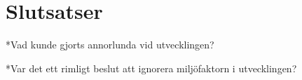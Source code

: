 \section{Slutsatser}
\label{sec:joel_a-conclusion}

*Vad kunde gjorts annorlunda vid utvecklingen?


*Var det ett rimligt beslut att ignorera miljöfaktorn i utvecklingen?
